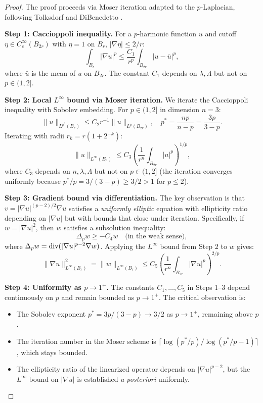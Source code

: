 \begin{proof}
The proof proceeds via Moser iteration adapted to the $p$-Laplacian, following Tolksdorf \cite{tolksdorf1984} and DiBenedetto \cite{dibenedetto1983}.

\textbf{Step 1: Caccioppoli inequality.}
For a $p$-harmonic function $u$ and cutoff $\eta \in C^\infty_c(B_{2r})$ with $\eta = 1$ on $B_r$, $|\nabla\eta| \le 2/r$:
\begin{equation}\label{eq:Caccioppoli}
    \int_{B_r} |\nabla u|^p \le \frac{C_1}{r^p} \int_{B_{2r}} |u - \bar{u}|^p,
\end{equation}
where $\bar{u}$ is the mean of $u$ on $B_{2r}$. The constant $C_1$ depends on $\lambda, \Lambda$ but not on $p \in (1, 2]$.

\textbf{Step 2: Local $L^\infty$ bound via Moser iteration.}
We iterate the Caccioppoli inequality with Sobolev embedding. For $p \in (1, 2]$ in dimension $n = 3$:
\begin{equation}
    \|u\|_{L^{p^*}(B_r)} \le C_2 r^{-1} \|u\|_{L^p(B_{2r})}, \quad p^* = \frac{np}{n-p} = \frac{3p}{3-p}.
\end{equation}
Iterating with radii $r_k = r(1 + 2^{-k})$:
\begin{equation}
    \|u\|_{L^\infty(B_r)} \le C_3 \left( \frac{1}{r^n} \int_{B_{2r}} |u|^p \right)^{1/p},
\end{equation}
where $C_3$ depends on $n, \lambda, \Lambda$ but not on $p \in (1, 2]$ (the iteration converges uniformly because $p^*/p = 3/(3-p) \ge 3/2 > 1$ for $p \le 2$).

\textbf{Step 3: Gradient bound via differentiation.}
The key observation is that $v = |\nabla u|^{(p-2)/2} \nabla u$ satisfies a \emph{uniformly elliptic} equation with ellipticity ratio depending on $|\nabla u|$ but with bounds that close under iteration. Specifically, if $w = |\nabla u|^2$, then $w$ satisfies a subsolution inequality:
\begin{equation}
    \Delta_p w \ge -C_4 w \quad \text{(in the weak sense)},
\end{equation}
where $\Delta_p w = \mathrm{div}(|\nabla u|^{p-2} \nabla w)$. Applying the $L^\infty$ bound from Step 2 to $w$ gives:
\begin{equation}
    \|\nabla u\|_{L^\infty(B_r)}^2 = \|w\|_{L^\infty(B_r)} \le C_5 \left( \frac{1}{r^n} \int_{B_{2r}} |\nabla u|^p \right)^{2/p}.
\end{equation}

\textbf{Step 4: Uniformity as $p \to 1^+$.}
The constants $C_1, \ldots, C_5$ in Steps 1--3 depend continuously on $p$ and remain bounded as $p \to 1^+$. The critical observation is:
\begin{itemize}
    \item The Sobolev exponent $p^* = 3p/(3-p) \to 3/2$ as $p \to 1^+$, remaining above $p$.
    \item The iteration number in the Moser scheme is $\lceil \log(p^*/p) / \log(p^*/p - 1) \rceil$, which stays bounded.
    \item The ellipticity ratio of the linearized operator depends on $|\nabla u|^{p-2}$, but the $L^\infty$ bound on $|\nabla u|$ is established \emph{a posteriori} uniformly.
\end{itemize}


\end{proof}
